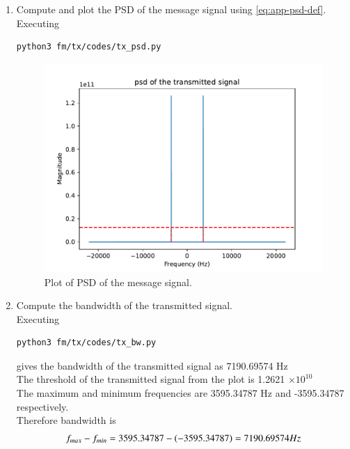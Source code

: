 \begin{enumerate}[label=\arabic*.,ref=\thesection.\theenumi]
\begin{figure}{H}
\caption{Plot of spectrum of transmitted signal.}
\label{fig:Trans}
\end{figure}
\item Compute and plot the PSD of the message signal using 
\eqref{eq:app-psd-def}.
\\
	\solution
Executing	
\begin{lstlisting}
python3 fm/tx/codes/tx_psd.py
\end{lstlisting}

\begin{figure}[H]
\centering
\includegraphics[width=\columnwidth]{fm/tx/figs/tx_psd.pdf}
\caption{Plot of PSD of the message signal.}
\label{fig:fm_PSD}
\end{figure}
\item Compute the bandwidth of the transmitted signal.
\\
\solution
Executing
\begin{lstlisting}
python3 fm/tx/codes/tx_bw.py
\end{lstlisting}
gives the bandwidth of the transmitted signal as 7190.69574 Hz
\\
The threshold of the transmitted signal from the plot is 1.2621 $\times 10^{10}$
\\
The maximum and minimum frequencies are 3595.34787 Hz and -3595.34787 respectively.
\\
Therefore bandwidth is\\
\begin{align}
\centering
f_{max}-f_{min} = 3595.34787-(-3595.34787) = 7190.69574 Hz
\end{align}

\end{enumerate}
